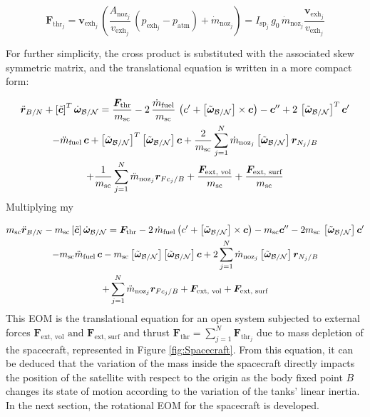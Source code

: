 \begin{equation}\label{eq:IspRel}
	\bm{F}_{\text{thr}_j}= \bm{v}_{\text{exh}_j}\,\left(\frac{A_{\text{noz}_j}}{v_{\text{exh}_j}}\,(p_{\text{exh}_j} - p_{\text{atm}}) + \dot{m}_{\text{noz}_j}\right) = I_{\text{sp}_j}\,g_0\,\dot{m}_{\text{noz}_j}\frac{\bm{v}_{\text{exh}_j}}{v_{\text{exh}_j}}
\end{equation}

For further simplicity, the cross product is substituted with the associated skew symmetric matrix, and the translational equation is written in a more compact form:

\begin{multline}\label{eq:eq29}
	\ddot{\bm{r}}_{B/N} + \left[\tilde{\bm{c}}\right]^T\dot{\bm{\omega}}_{\cal{B}/\cal{N}} =  \frac{\bm{F}_{\text{thr}}}{m_{\text{sc}}} - 2\,\frac{\dot{m}_{\text{fuel}}}{m_{\text{sc}}}\,\left(c' + \left[\tilde{\bm{\omega}}_{\cal{B}/\cal{N}}\right]\times\bm{c}\right) - \bm{c}''+2\,\left[\tilde{\bm{\omega}}_{\cal{B}/\cal{N}}\right]^T
	\bm{c}'\\- \ddot{m}_{\text{fuel}}\,\bm{c} + \left[\tilde{\bm{\omega}}_{\cal{B}/\cal{N}}\right]^T \left[\tilde{\bm{\omega}}_{\cal{B}/\cal{N}}\right] \bm{c} +\frac{2}{m_{\text{sc}}}\sum_{j=1}^{N}\dot{m}_{\text{noz}_j} \left[\tilde{\bm{\omega}}_{\cal{B}/\cal{N}}\right] \bm{r}_{N_j/B}
	\\+ \frac{	1}{m_{\text{sc}}} \sum_{j=1}^{N}\ddot{m}_{\text{noz}_j}\bm{r}_{Fc_j/B}  +\frac{\bm{F}_{\text{ext, vol}}}{m_{\text{sc}}}  + \frac{\bm{F}_{\text{ext, surf}}}{m_{\text{sc}}} 
\end{multline}
Multiplying my 

\begin{multline}\label{eq:eq30}
m_{\text{sc}} \ddot{\bm{r}}_{B/N} - m_{\text{sc}} \left[\tilde{\bm{c}}\right]\dot{\bm{\omega}}_{\cal{B}/\cal{N}} =  \bm{F}_{\text{thr}} - 2\,\dot{m}_{\text{fuel}} \left(c' + \left[\tilde{\bm{\omega}}_{\cal{B}/\cal{N}}\right]\times\bm{c}\right) - m_{\text{sc}} \bm{c}''-2 m_{\text{sc}} \,\left[\tilde{\bm{\omega}}_{\cal{B}/\cal{N}}\right]
\bm{c}'\\- m_{\text{sc}} \ddot{m}_{\text{fuel}}\,\bm{c} - m_{\text{sc}} \left[\tilde{\bm{\omega}}_{\cal{B}/\cal{N}}\right] \left[\tilde{\bm{\omega}}_{\cal{B}/\cal{N}}\right] \bm{c} +2 \sum_{j=1}^{N}\dot{m}_{\text{noz}_j} \left[\tilde{\bm{\omega}}_{\cal{B}/\cal{N}}\right] \bm{r}_{N_j/B}
\\+ \sum_{j=1}^{N}\ddot{m}_{\text{noz}_j}\bm{r}_{Fc_j/B}  +\bm{F}_{\text{ext, vol}} + \bm{F}_{\text{ext, surf}}
\end{multline}
This EOM is the translational equation for an open system subjected to external forces $\bm{F}_{\text{ext, vol}} \text{ and } \bm{F}_{\text{ext, surf}}$ and thrust $\bm{F}_{\text{thr}}=\sum_{j=1}^{N}\bm{F}_{\text{thr}_j}$ due to mass depletion of the spacecraft, represented in Figure \ref{fig:Spacecraft}.
From this equation, it can be deduced that the variation of the mass inside the spacecraft directly impacts the position of the satellite with respect to the origin as the body fixed point $B$ changes its state of motion according to the variation of the tanks' linear inertia. In the next section, the rotational EOM for the spacecraft is developed.

